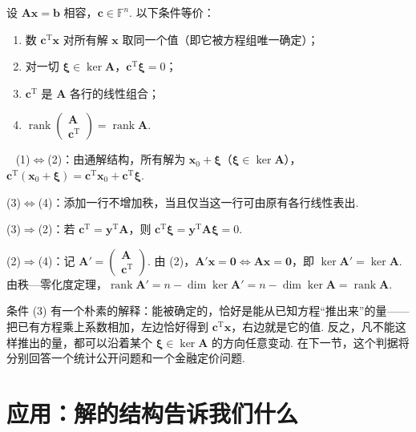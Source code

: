 \documentclass[lang=cn,10.5pt,scheme=chinese,toc=twocol,section,chinesefont=nofont,
twoside,citestyle=gb7714-2015,bibstyle=gb7714-2015]{elegantbook}
\DeclareRobustCommand{\textbf}[1]{{\lnsemiboldlatin\lnsemiboldcjk #1}}
\newcommand{\vv}[1]{\boldsymbol{#1}}
\newcommand{\zero}{\boldsymbol{0}}          %
\newcommand{\trans}{\mathrm{T}}             %
\numberwithin{equation}{section}   %
\newcommand{\rk}{\operatorname{rank}}       %
\newcommand{\hC}{\texorpdfstring{\textdaggerdbl}{‡}}
\newcommand*{\lnlabel}[1]{{\sffamily\bfseries\color{black}#1}}
\renewenvironment{proof}{%
	\par\noindent\lnlabel{\proofname}\;\ \color{black!90}\cfs}{\par}
\begin{document}
\begin{theorem}[可确定性判据]\label{thm:sol-determinable}
  设 $\vv{Ax}=\vv b$ 相容，$\vv c\in\mathbb{F}^n$. 以下条件等价：
  \begin{enumerate}
    \item 数 $\vv c^\trans\vv x$ 对所有解 $\vv x$ 取同一个值（即它被方程组\textbf{唯一确定}）；
    \item 对一切 $\vv\xi\in\ker\vv A$，$\vv c^\trans\vv\xi=0$；
    \item $\vv c^\trans$ 是 $\vv A$ 各行的线性组合；
    \item $\rk
            \begin{pmatrix}
              \vv A \\ \vv c^\trans
            \end{pmatrix}
            =\rk\vv A$.
  \end{enumerate}
\end{theorem}
\begin{proof}
  (1)$\Leftrightarrow$(2)：由通解结构，所有解为 $\vv x_0+\vv\xi$（$\vv\xi\in\ker\vv A$），$\vv c^\trans(\vv x_0+\vv\xi)=\vv c^\trans\vv x_0+\vv c^\trans\vv\xi$.

  (3)$\Leftrightarrow$(4)：添加一行不增加秩，当且仅当这一行可由原有各行线性表出.

  (3)$\Rightarrow$(2)：若 $\vv c^\trans=\vv y^\trans\vv A$，则 $\vv c^\trans\vv\xi=\vv y^\trans\vv{A\xi}=0$.

  (2)$\Rightarrow$(4)：记 $\vv A'=
    \begin{pmatrix}
      \vv A \\ \vv c^\trans
    \end{pmatrix}
  $. 由 (2)，$\vv A'\vv x=\zero\iff\vv{Ax}=\zero$，即 $\ker\vv A'=\ker\vv A$. 由秩—零化度定理，$\rk\vv A'=n-\dim\ker\vv A'=n-\dim\ker\vv A=\rk\vv A$.
\end{proof}

\begin{motivebox}
  条件 (3) 有一个朴素的解释：\textbf{能被确定的，恰好是能从已知方程“推出来”的量}——把已有方程乘上系数相加，左边恰好得到 $\vv c^\trans\vv x$，右边就是它的值. 反之，凡不能这样推出的量，都可以沿着某个 $\vv\xi\in\ker\vv A$ 的方向任意变动. 在下一节，这个判据将分别回答一个统计公开问题和一个金融定价问题.
\end{motivebox}

\section{\hC 应用：解的结构告诉我们什么}
\end{document}
